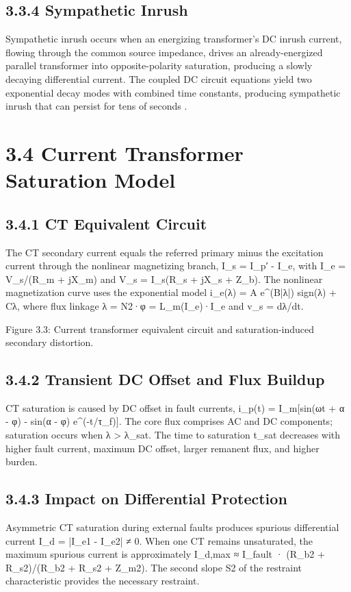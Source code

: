 \subsection{3.3.4  Sympathetic Inrush}
Sympathetic inrush occurs when an energizing transformer's DC inrush current, flowing through the common source impedance, drives an already-energized parallel transformer into opposite-polarity saturation, producing a slowly decaying differential current. The coupled DC circuit equations yield two exponential decay modes with combined time constants, producing sympathetic inrush that can persist for tens of seconds \cite{ref4}.


\section{3.4  Current Transformer Saturation Model}

\subsection{3.4.1  CT Equivalent Circuit}
The CT secondary current equals the referred primary minus the excitation current through the nonlinear magnetizing branch, I\_s = I\_p′ - I\_e, with I\_e = V\_s/(R\_m + jX\_m) and V\_s = I\_s(R\_s + jX\_s + Z\_b). The nonlinear magnetization curve uses the exponential model i\_e(λ) = A e^(B|λ|) sign(λ) + Cλ, where flux linkage λ = N2·φ = L\_m(I\_e)·I\_e and v\_s = dλ/dt.

Figure 3.3: Current transformer equivalent circuit and saturation-induced secondary distortion.


\subsection{3.4.2  Transient DC Offset and Flux Buildup}
CT saturation is caused by DC offset in fault currents, i\_p(t) = I\_m[sin(ωt + α - φ) - sin(α - φ) e^(-t/τ\_f)]. The core flux comprises AC and DC components; saturation occurs when λ > λ\_sat. The time to saturation t\_sat decreases with higher fault current, maximum DC offset, larger remanent flux, and higher burden.


\subsection{3.4.3  Impact on Differential Protection}
Asymmetric CT saturation during external faults produces spurious differential current I\_d = |I\_e1 - I\_e2| ≠ 0. When one CT remains unsaturated, the maximum spurious current is approximately I\_d,max ≈ I\_fault · (R\_b2 + R\_s2)/(R\_b2 + R\_s2 + Z\_m2). The second slope S2 of the restraint characteristic provides the necessary restraint.


